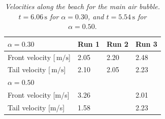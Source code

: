 \documentclass[review, authoryear]{elsarticle}
\newcommand{\s}{\,\mbox{s}}
\newcommand{\mps}{\,\mbox{m/s}}
\begin{document}
\begin{table}[]
\centering
\caption{\textit{ Velocities along the beach for the main air bubble. $t=6.06\s$ for $\alpha=0.30$, and $t=5.54\s$ for $\alpha=0.50$}.}
\label{vel_bubb}
\begin{tabular}{llll}
\hline
{\bf $\alpha=0.30$}                    & Run 1 & Run 2 & Run 3 \\ \hline
Front velocity {[}$\mps${]}  & 2.05  & 2.20  & 2.48  \\
Tail velocity {[}$\mps${]}  & 2.10  & 2.05  & 2.23  \\ \hline
{\bf $\alpha=0.50$}                    &       &       &       \\ \hline
Front velocity {[}m/s{]}  & 3.26  &   & 2.01  \\
Tail velocity {[}m/s{]}   & 1.58  &   & 2.23 
\end{tabular}
\end{table} 
 
 
 
 
\end{document}
